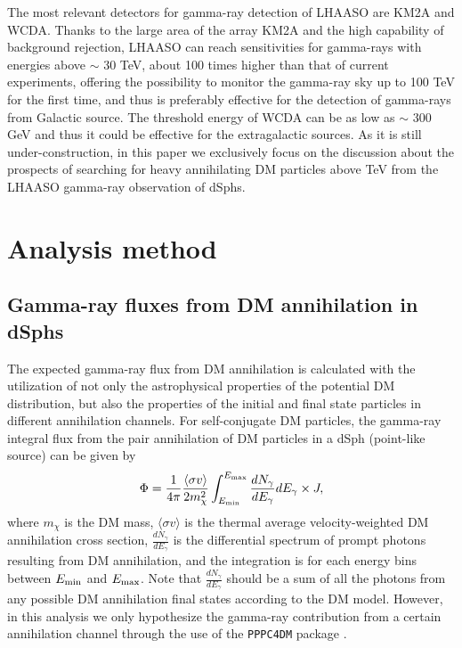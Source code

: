 \documentclass[12pt,aps,prd,amsmath,amssymb,showpacs,floats,floatfix,nofootinbib]{revtex4-1}
\begin{document}
The most relevant detectors for gamma-ray detection of LHAASO are KM2A and WCDA. Thanks to the large area of the array KM2A and the high capability of background rejection, LHAASO can reach sensitivities for gamma-rays with energies above $\sim$ 30 TeV, about 100 times higher than that of current experiments, offering the possibility to monitor the gamma-ray sky up to 100 TeV for the first time,
and thus is preferably effective for the detection of gamma-rays from Galactic source.
The threshold energy of WCDA can be as low as $\sim$ 300 GeV and thus it could be effective for the extragalactic sources.
As it is still under-construction, in this paper we exclusively focus on the discussion about the prospects of searching for heavy annihilating DM particles above TeV from the LHAASO gamma-ray observation of dSphs.

\section{Analysis method}\label{sec:method}

\subsection{Gamma-ray fluxes from DM annihilation in dSphs}\label{sec:gamma-flux}
The expected gamma-ray flux from DM annihilation is calculated with the utilization of not only the astrophysical properties of the potential DM distribution, but also the properties of the initial and final state particles in different annihilation channels. For self-conjugate DM particles, the gamma-ray integral flux from the pair annihilation of DM particles in a dSph (point-like source) can be given by
\begin{equation}\label{func:anni-flux}
\Phi=\frac{1}{4\pi}\frac{\langle\sigma v\rangle}{2m_{\chi}^{2}}\int^{E_{\rm max}}_{E_{\rm min}}\frac{dN_{\gamma}}{dE_{\gamma}}dE_{\gamma} \times J,
\end{equation}
where $m_{\chi}$ is the DM mass, $\langle\sigma v\rangle$ is the thermal average velocity-weighted DM annihilation cross section, $\frac{dN_{\gamma}}{dE_{\gamma}}$ is the differential spectrum of prompt photons resulting from DM annihilation, and the integration is for each energy bins between $E_{\rm min}$ and $E_{\rm max}$. Note that $\frac{dN_{\gamma}}{dE_{\gamma}}$ should be a sum of all the photons from any possible DM annihilation final states according to the DM model. However, in this analysis we only hypothesize the gamma-ray contribution from a certain annihilation channel through the use of the {\tt PPPC4DM} package \cite{Cirelli:2010xx,Ciafaloni:2010ti}.
\end{document}
